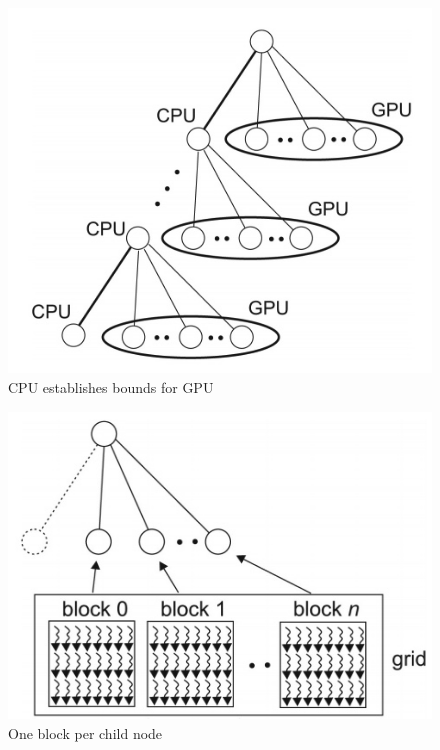 \begin{figure}[!htbp]
    \centering
    \includegraphics[scale=0.4]{images/pvs.jpg}
    \caption{CPU establishes bounds for GPU\cite{pvsgpu}}
\end{figure}

\begin{figure}[!htbp]
    \centering
    \includegraphics[scale=0.4]{images/pvs2.jpg}
    \caption{One block per child node\cite{pvsgpu}}
\end{figure}

